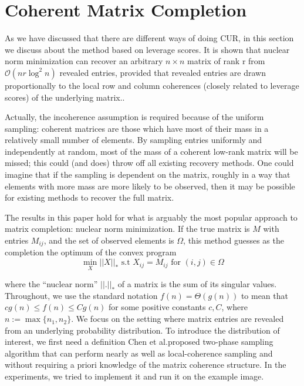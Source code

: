 \documentclass{article}
\begin{document}
\section{Coherent Matrix Completion}
As we have discussed that there are different ways of doing CUR, in this section we discuss about the method based on leverage scores. It is shown that nuclear norm minimization can recover an arbitrary $n \times n$ matrix of rank r from $\mathcal{O}(nr\log^2{}n)$ revealed entries, provided that revealed entries are drawn proportionally to the local row and column coherences (closely related to leverage scores) of the underlying matrix.\cite{ChenCoherentCompletion}. 

Actually, the incoherence assumption is required because of the uniform sampling: coherent matrices are those which have most of their mass in a relatively small number of elements. By sampling entries uniformly and independently at random, most of the mass of a coherent low-rank matrix will be missed; this could (and does) throw off all existing recovery methods. One could imagine that if the sampling is dependent on the matrix, roughly in a way that elements with more mass are more likely to be observed, then it may be possible for existing methods to recover the full matrix.


The results in this paper hold for what is arguably the most popular approach to matrix completion: nuclear norm minimization. If the true matrix is $M$ with entries $M_{ij}$, and the
set of observed elements is $\Omega$, this method guesses as the
completion the optimum of the convex program
\begin{equation}
    \min_{X} ||X||_{*} 
    \text{   s.t   } X_{ij} = M_{ij} \text{  for } (i,j)  \in \Omega
\end{equation}

where the “nuclear norm” $||.||_{*}$ of a matrix is the sum of its
singular values. Throughout, we use the standard notation $f(n) = \Theta(g(n))$ to mean that $cg(n) \leq f(n) \leq Cg(n)$ for
some positive constants $c, C$, where $n := \max \{ n_1, n_2\}$.
We focus on the setting where matrix entries are revealed from an underlying probability distribution. To introduce the distribution of interest, we first need a definition
Chen et al.\cite{ChenCoherentCompletion}proposed two-phase sampling algorithm that can perform nearly as well as local-coherence sampling and without requiring a priori knowledge of the matrix coherence structure. In the experiments, we tried to implement it and run it on the example image.
\end{document}
